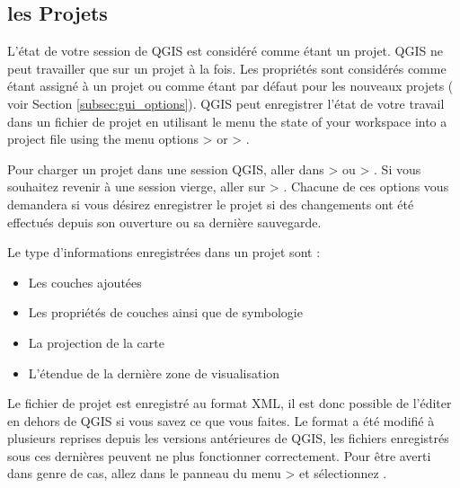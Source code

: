 \subsection{les Projets}\label{sec:projects}

L'\'etat de votre session de QGIS est consid\'er\'e comme \'etant un projet. QGIS ne peut travailler que sur un projet \`a la fois. Les propri\'et\'es sont consid\'er\'es comme \'etant assign\'e \`a un projet ou comme \'etant par d\'efaut pour les nouveaux projets ( voir Section \ref{subsec:gui_options}). QGIS peut enregistrer l'\'etat de votre travail dans un fichier de projet en utilisant le menu the state of your 
workspace into a project file using the menu options 
 > 
or  > .

Pour charger un projet dans une session QGIS, aller dans  >  ou  > . Si vous souhaitez revenir \`a une session vierge, aller sur  > .
Chacune de ces options vous demandera si vous d\'esirez enregistrer le projet si des changements ont \'et\'e effectu\'es depuis son ouverture ou sa derni\`ere sauvegarde.

Le type d'informations enregistr\'ees dans un projet sont :

\begin{itemize}
\item Les couches ajout\'ees
\item Les propri\'et\'es de couches ainsi que de symbologie
\item La projection de la carte
\item L'\'etendue de la derni\`ere zone de visualisation
\end{itemize}
%


Le fichier de projet est enregistr\'e au format XML, il est donc possible de l'\'editer en dehors de QGIS si vous savez ce que vous faites. Le format a \'et\'e modifi\'e \`a plusieurs reprises depuis les versions ant\'erieures de QGIS, les fichiers enregistr\'es sous ces derni\`eres peuvent ne plus fonctionner correctement. Pour \^etre averti dans genre de cas, allez dans le panneau  du menu  >  
et s\'electionnez .

